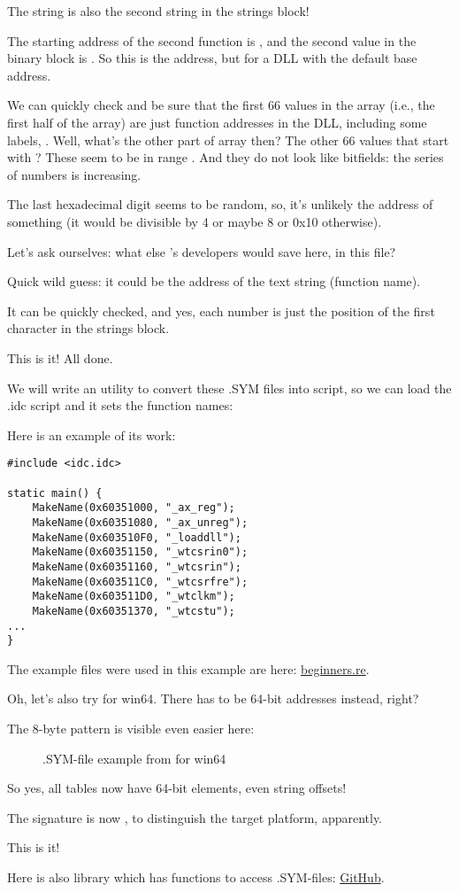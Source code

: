 The  string is also the second string in the strings block!

The starting address of the second function is , and the second value in the binary 
block is .
So this is the address, 
but for a DLL with the default base address.

We can quickly check and be sure that the first 66 values in the array (i.e., the first half of the array) 
are just function addresses in the DLL, including some labels, \etc{}.
Well, what's the other part of array then? 
The other 66 values that start with ? 
These seem to be in range \TT{[0...0x3F8]}. 
And they do not look like bitfields: 
the series of numbers is increasing.

The last hexadecimal digit seems to be random, so, it's unlikely the address of something 
(it would be divisible by 4 or maybe 8 or 0x10 otherwise).

Let's ask ourselves: what else \oracle's developers would save here, in this file?

Quick wild guess: it could be the address of the text string (function name).

It can be quickly checked, and yes, each number is just the position of the first character in the strings block.

This is it! All done.

We will write an utility to convert these .SYM files into \IDA script, 
so we can load the .idc script and it sets the function names:



Here is an example of its work:

\begin{lstlisting}[style=customc]
#include <idc.idc>

static main() {
	MakeName(0x60351000, "_ax_reg");
	MakeName(0x60351080, "_ax_unreg");
	MakeName(0x603510F0, "_loaddll");
	MakeName(0x60351150, "_wtcsrin0");
	MakeName(0x60351160, "_wtcsrin");
	MakeName(0x603511C0, "_wtcsrfre");
	MakeName(0x603511D0, "_wtclkm");
	MakeName(0x60351370, "_wtcstu");
...
}
\end{lstlisting}

The example files were used in this example are here: 
\href{http://go.yurichev.com/17216}{beginners.re}.

\clearpage
Oh, let's also try \oracle for win64.
There has to be 64-bit addresses instead, right?

The 8-byte pattern is visible even easier here:

\begin{figure}[H]
\centering
{}
\caption{.SYM-file example from \oracle for win64}
\label{fig:oracle_SYM_whole64}
\end{figure}

So yes, all tables now have 64-bit elements, even string offsets!

The signature is now , to distinguish the target platform, apparently.

This is it!

Here is also library which has functions to access \oracle .SYM-files:
\href{http://go.yurichev.com/17007}{GitHub}.
